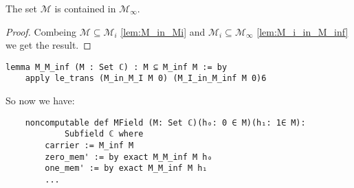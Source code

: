 \begin{lemma}
    The set $\mathcal{M}$ is contained in $\mathcal{M}_{\infty}$.
\end{lemma}

\begin{proof}
    Combeing $\mathcal{M} \subseteq \mathcal{M}_i$ \ref{lem:M_in_Mi} and $\mathcal{M}_i \subseteq \mathcal{M}_{\infty}$ \ref{lem:M_i_in_M_inf} we get the result.
\end{proof}

\begin{lstlisting}
lemma M_M_inf (M : Set ℂ) : M ⊆ M_inf M := by 
    apply le_trans (M_in_M_I M 0) (M_I_in_M_inf M 0)6
\end{lstlisting}

So now we have:
\begin{lstlisting}
    noncomputable def MField (M: Set ℂ)(h₀: 0 ∈ M)(h₁: 1∈ M): 
            Subfield ℂ where
        carrier := M_inf M
        zero_mem' := by exact M_M_inf M h₀
        one_mem' := by exact M_M_inf M h₁
        ...
\end{lstlisting}
